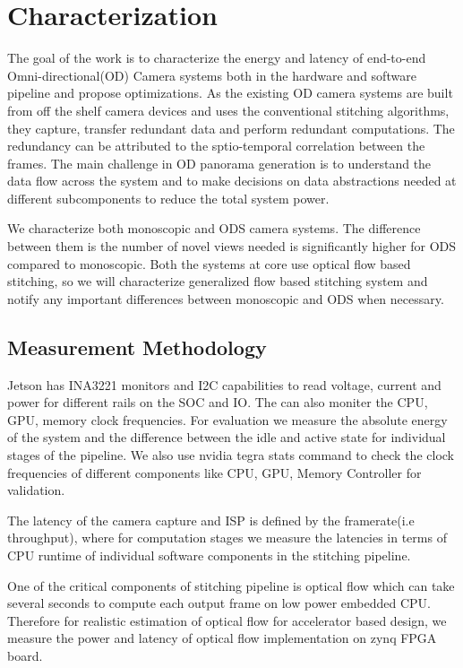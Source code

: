 \chapter{Characterization}

The goal of the work is to characterize the energy and latency of end-to-end Omni-directional(OD) Camera  systems both in the hardware and software pipeline and propose optimizations. As the existing OD camera systems are built from off the shelf camera devices and uses the conventional stitching algorithms, they capture, transfer redundant data and perform redundant computations. The redundancy can be attributed to the sptio-temporal correlation between the frames. The main challenge in OD panorama generation is to understand the data flow across the system and to make decisions on data abstractions needed at different subcomponents to reduce the total system power.

We characterize both monoscopic and ODS camera systems. The difference between them is the number of novel views needed is significantly higher for ODS compared to monoscopic. Both the systems at core use optical flow based stitching, so we will characterize generalized flow based stitching system and notify any important differences between monoscopic and ODS when necessary.\newline


\section{Measurement Methodology} %
Jetson has INA3221 monitors and I2C capabilities to read voltage, current and power for different rails on the SOC and IO. The can also moniter the CPU, GPU, memory clock frequencies. For evaluation we measure the absolute energy of the system and the difference between the idle and active state for individual stages of the pipeline. We also use nvidia tegra stats command to check the clock frequencies of different components like CPU, GPU, Memory Controller for validation.

The latency of the camera capture and ISP is defined by the framerate(i.e throughput), where for computation stages we measure the latencies in terms of CPU runtime of individual software components in the stitching pipeline. 

One of the critical components of stitching pipeline is optical flow which can take several seconds to compute each output frame on low power embedded CPU. Therefore for realistic estimation of optical flow for accelerator based design, we measure the power and latency of optical flow implementation on zynq FPGA board. 

